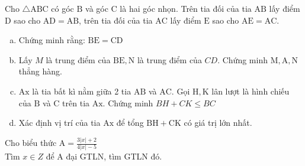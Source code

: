 \begin{bt}
	Cho $\triangle \mathrm{ABC}$ có góc $\mathrm{B}$ và góc $\mathrm{C}$ là hai góc nhọn. Trên tia đối của tia $\mathrm{AB}$ lấy điểm $\mathrm{D}$ sao cho $\mathrm{AD}=\mathrm{AB}$, trên tia đối của tia $\mathrm{AC}$ lấy điểm $\mathrm{E}$ sao cho $\mathrm{AE}=\mathrm{AC}$.
	\begin{enumerate}[a.]
		\item Chứng minh rằng: $\mathrm{BE}=\mathrm{CD}$
		\item Lấy $M$ là trung điểm của $\mathrm{BE}, \mathrm{N}$ là trung điểm của $C D$. Chứng minh $\mathrm{M}, \mathrm{A}, \mathrm{N}$ thẳng hàng.
		\item $\mathrm{Ax}$ là tia bất kì nằm giữa 2 tia $\mathrm{AB}$ và $\mathrm{AC}$. Gọi $\mathrm{H}, \mathrm{K}$ lân lượt là hình chiếu của $\mathrm{B}$ và $\mathrm{C}$ trên tia $\mathrm{Ax}$. Chứng minh $B H+C K \leq B C$
		\item Xác định vị trí của tia $\mathrm{Ax}$ để tổng $\mathrm{BH}+\mathrm{CK}$ có giá trị lớn nhất.
	\end{enumerate}
	\loigiai{}
\end{bt}

\begin{bt}
	Cho biểu thức $\mathrm{A}=\frac{3|x|+2}{4|x|-5}$ \\Tìm $x \in Z$ để $\mathrm{A}$ đại GTLN, tìm GTLN đó.
	\loigiai{}
\end{bt}

